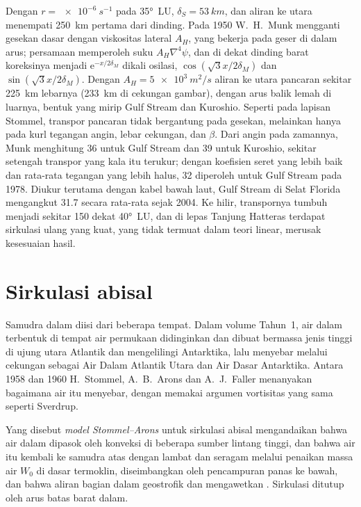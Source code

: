 Dengan $r = \qty{e-6}{s^{-1}}$ pada \ang{35}~LU, $\delta_S = \qty{53}{km}$, dan
aliran ke utara menempati \qty{250}{km} pertama dari dinding. Pada 1950
W.~H.~Munk mengganti gesekan dasar dengan viskositas  lateral $A_H$,
yang bekerja pada geser di dalam arus; persamaan memperoleh suku
$A_H\nabla^4\psi$, dan di dekat dinding barat koreksinya menjadi
$\mathrm e^{-x/2\delta_M}$ dikali osilasi, $\cos(\sqrt3x/2\delta_M)$
dan $\sin(\sqrt3x/2\delta_M)$. Dengan $A_H = \qty{5e3}{m^2/s}$ aliran ke utara
pancaran sekitar \qty{225}{km} lebarnya (\qty{233}{km} di cekungan gambar),
dengan arus balik lemah di luarnya, bentuk yang mirip Gulf Stream dan
Kuroshio. Seperti pada lapisan Stommel, transpor pancaran tidak
bergantung pada gesekan, melainkan hanya pada kurl tegangan angin, lebar
cekungan, dan $\beta$. Dari angin pada zamannya, Munk menghitung
\qty{36}{\sverdrup} untuk Gulf Stream dan \qty{39}{\sverdrup} untuk
Kuroshio, sekitar setengah transpor yang kala itu terukur; dengan koefisien seret yang lebih baik
dan rata-rata tegangan yang lebih halus, \qty{32}{\sverdrup} diperoleh
untuk Gulf Stream pada 1978. Diukur terutama dengan kabel bawah laut,
Gulf Stream di Selat Florida mengangkut \qty{31.7}{\sverdrup} secara
rata-rata sejak 2004. Ke hilir, transpornya tumbuh menjadi sekitar \qty{150}{\sverdrup} dekat
\ang{40}~LU, dan di lepas Tanjung Hatteras terdapat sirkulasi ulang yang kuat, yang
tidak termuat dalam teori linear, merusak kesesuaian hasil.

\section{Sirkulasi abisal}\label{sec:b3:ocean-dynamics:abyssal}

Samudra dalam diisi dari beberapa tempat. Dalam volume Tahun~1, air dalam
terbentuk di tempat air permukaan didinginkan dan dibuat bermassa jenis tinggi di ujung utara
Atlantik dan mengelilingi Antarktika, lalu menyebar melalui cekungan sebagai
Air Dalam Atlantik Utara dan Air Dasar Antarktika. Antara 1958 dan 1960
H.~Stommel, A.~B.~Arons dan A.~J.~Faller menanyakan bagaimana air itu menyebar, dengan memakai
argumen vortisitas yang sama seperti Sverdrup.

\begin{definition}\label{def:b3:ocean-dynamics:abyssal}
Yang disebut \emph{model Stommel--Arons} untuk sirkulasi abisal
mengandaikan bahwa air dalam dipasok oleh konveksi di beberapa sumber
lintang tinggi, dan bahwa air itu kembali ke samudra atas dengan lambat dan
seragam melalui penaikan massa air $W_0$ di dasar termoklin, diseimbangkan oleh
pencampuran panas ke bawah, dan bahwa aliran bagian dalam geostrofik dan
mengawetkan . Sirkulasi ditutup oleh arus batas barat
dalam.
\end{definition}

